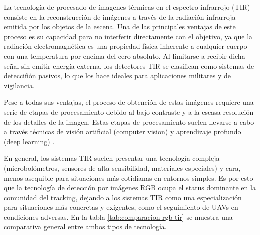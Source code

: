{La tecnología de procesado de ímagenes térmicas en el espectro infrarrojo (TIR) consiste en la reconstrucción de imágenes a través de la radiación infrarroja emitida por los objetos de la escena. Una de las principales ventajas de este proceso es su capacidad para no interferir directamente con el objetivo, ya que la radiación electromagnética es una propiedad física inherente a cualquier cuerpo con una temperatura por encima del cero absoluto. Al limitarse a recibir dicha señal sin emitir energía externa, los detectores TIR se clasifican como sistemas de detecciñón pasivos, lo que los hace ideales para aplicaciones militares y de vigilancia. 

Pese a todas sus ventajas, el proceso de obtención de estas imágenes requiere una serie de etapas de procesamiento debido al bajo contraste y a la escasa resolución de los detalles de la imagen. Estas etapas de procesamiento suelen llevarse a cabo a través técnicas de visión artificial (computer vision) y aprendizaje profundo (deep learning) \cite{review_infrared_imaging}. 

En general, los sistemas TIR suelen presentar una tecnología compleja (microbolómetros, sensores de alta sensibilidad, materiales especiales) y cara, menos asequible para situaciones más cotidianas en entornos simples. Es por esto que la tecnología de detección por imágenes RGB ocupa el status dominante en la comunidad del tracking, dejando a los sistemas TIR como una especialización para situaciones más concretas y exigentes, como el seguimiento de UAVs en condiciones adversas. En la tabla \ref{tab:comparacion-rgb-tir} se muestra una comparativa general entre ambos tipos de tecnología.

\vspace{0.6cm}

}
